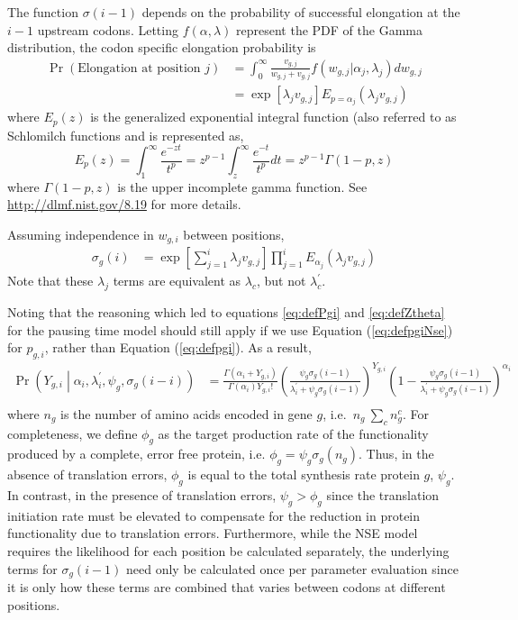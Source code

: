 \documentclass{article}
\newcommand{\waitTerm}{\ensuremath{w}\xspace}
\newcommand{\wgi}{\ensuremath{\waitTerm_{g,i}}\xspace}
\newcommand{\wgj}{\ensuremath{\waitTerm_{g,j}}\xspace}
\newcommand{\alphai}{\ensuremath{{\alpha_i}}\xspace}
\newcommand{\alphaj}{\ensuremath{{\alpha_j}}\xspace}
\newcommand{\lambdac}{\ensuremath{{\lambda_c}}\xspace}
\newcommand{\lambdacprime}{\ensuremath{{\lambda_c^\prime}}\xspace}
\newcommand{\lambdaiprime}{\ensuremath{{\lambda_i^\prime}}\xspace}
\newcommand{\lambdaj}{\ensuremath{{\lambda_j}}\xspace}
\newcommand{\nseTerm}{\ensuremath{v}\xspace}
\newcommand{\vgj}{\ensuremath{\nseTerm_{g,j}}\xspace}
\newcommand{\sigmag}{\ensuremath{\sigma_{g}}\xspace}
\newcommand{\pgi}{\ensuremath{{p_{g,i}}}\xspace}
\newcommand{\ngc}{\ensuremath{{n_{g}^c}}\xspace}
\renewcommand{\ng}{\ensuremath{{n_{g}}}\xspace}
\newcommand{\psig}{\ensuremath{{\psi_g}}\xspace}
\newcommand{\phig}{\ensuremath{{\phi_g}}\xspace}
\newcommand{\Ygi}{\ensuremath{{Y_{g,i}}}\xspace}
\begin{document}
The function $\sigma(i-1)$ depends on the probability of successful elongation at the $i-1$ upstream codons.
Letting $f(\alpha, \lambda)$ represent the PDF of the Gamma distribution, the codon specific elongation probability is
\begin{align}
  \label{eq:defElongPr}
\Pr(\text{Elongation at position $j$}) &= \int_0^\infty \frac{\vgj}{\wgj + \vgj} f\left(\wgj | \alphaj, \lambdaj\right) d\wgj\\
 &= \exp\left[\lambdaj \vgj\right] E_{p = \alphaj}\left(\lambdaj \vgj\right)
\end{align}
where $E_p(z)$ is the generalized exponential integral function (also referred to as Schlomilch functions \citep[][p.380]{OldhamEtAl09} and is represented as,
\begin{equation}
  \label{eq:defGeneralizedExpoInt}
   E_p(z) = \int_1^\infty \frac{e^{-z t}}{t^p} = z^{p-1} \int_z^\infty \frac{e^{-t}}{t^p} dt = z^{p-1} \Gamma(1-p,z)
\end{equation}
where $\Gamma(1-p,z)$ is the upper incomplete gamma function.
See \href{http://dlmf.nist.gov/8.19}{http://dlmf.nist.gov/8.19} for more details.

Assuming independence in \wgi between positions, 
  \label{eq:defSigmag}
\begin{align}
  \sigmag(i) &=  \exp\left[\sum_{j=1}^i \lambdaj \vgj\right]  \prod_{j=1}^{i} E_{\alphaj}\left(\lambdaj \vgj\right)
\end{align}
Note that these \lambdaj terms are equivalent as \lambdac, but not \lambdacprime.

Noting that the reasoning which led to equations \ref{eq:defPgi} and \ref{eq:defZtheta} for the pausing time model should still apply if we use Equation (\ref{eq:defpgiNse}) for \pgi, rather than Equation (\ref{eq:defpgi}). 
As a result,
\begin{align}
  \label{eq:distYgSiteNse}
  \Pr\left(\Ygi \middle| \alphai, \lambdaiprime, \psig, \sigmag(i-i)\right) 
  &= \frac{\Gamma\left(\alphai + \Ygi\right)}{\Gamma\left(\alphai\right) \Ygi!} 
  \left(\frac{\psig \sigmag(i-1)}{\lambdaiprime + \psig \sigmag(i-1)}\right)^\Ygi \left(1-\frac{\psig\sigmag(i-1)}{\lambdaiprime + \psig \sigmag(i-1)}\right)^\alphai\\
\end{align}
where \ng is the number of amino acids encoded in gene $g$, i.e.~$\ng \ \sum_c \ngc$.
For completeness, we define $\phig$ as the target production rate of the functionality produced by a complete, error free protein, i.e. $\phig = \psig \sigmag(\ng)$.
Thus, in the absence of translation errors, $\phig$ is equal to the total synthesis rate protein $g$, $\psig$.
In contrast, in the presence of translation errors, $\psig > \phig$ since the translation initiation rate must be elevated to compensate for the reduction in protein functionality due to translation errors.
Furthermore, while the NSE model requires the likelihood for each position be calculated separately, the underlying terms for $\sigmag(i-1)$ need only be calculated once per parameter evaluation since it is only how these terms are combined that varies between codons at different positions.
\end{document}
